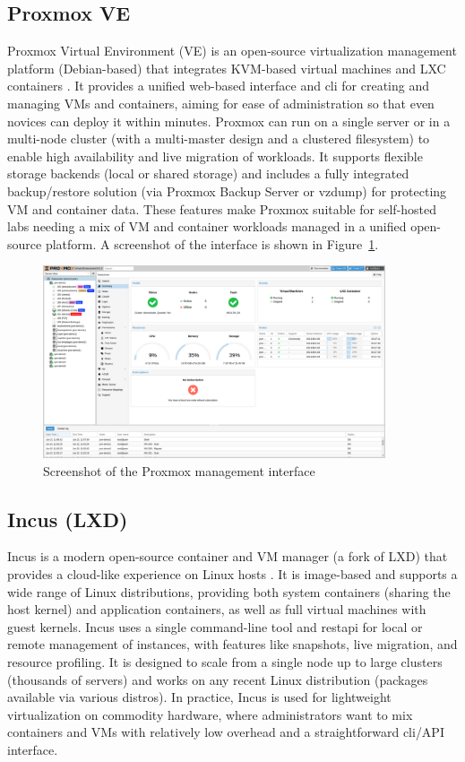 \subsection*{Proxmox VE}

Proxmox Virtual Environment (VE) is an open-source virtualization management platform (Debian-based) that integrates KVM-based virtual machines and LXC containers \cite{proxmox-admin-guide-2025}. It provides a unified web-based interface and \gls{cli} for creating and managing VMs and containers, aiming for ease of administration so that even novices can deploy it within minutes. Proxmox can run on a single server or in a multi-node cluster (with a multi-master design and a clustered filesystem) to enable high availability and live migration of workloads. It supports flexible storage backends (local or shared storage) and includes a fully integrated backup/restore solution (via Proxmox Backup Server or vzdump) for protecting VM and container data. These features make Proxmox suitable for self-hosted labs needing a mix of VM and container workloads managed in a unified open-source platform. A screenshot of the interface is shown in Figure~\ref{fig:proxmox-ui}.

\begin{figure}[h!]
  \centering
  \includegraphics[width=0.9\textwidth]{imaxes/proxmox-ui.png}
  \caption{Screenshot of the Proxmox management interface}
  \label{fig:proxmox-ui}
\end{figure}

\subsection*{Incus (LXD)}

Incus is a modern open-source container and VM manager (a fork of LXD) that provides a cloud-like experience on Linux hosts \cite{incus-linux-containers-2023}. It is image-based and supports a wide range of Linux distributions, providing both system containers (sharing the host kernel) and application containers, as well as full virtual machines with guest kernels. Incus uses a single command-line tool and \gls{restapi} for local or remote management of instances, with features like snapshots, live migration, and resource profiling. It is designed to scale from a single node up to large clusters (thousands of servers)  and works on any recent Linux distribution (packages available via various distros). In practice, Incus is used for lightweight virtualization on commodity hardware, where administrators want to mix containers and VMs with relatively low overhead and a straightforward \gls{cli}/API interface.

